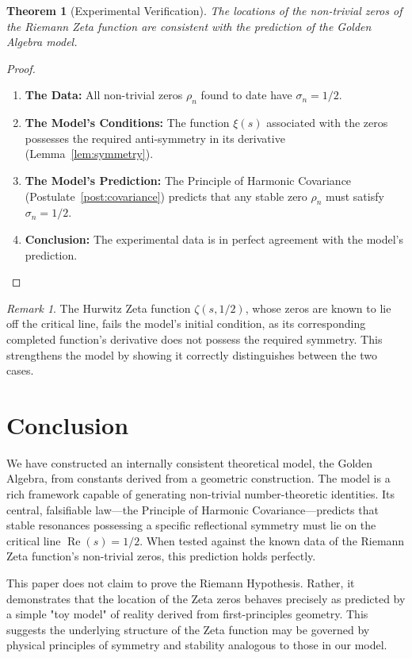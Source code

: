 \documentclass{amsart}
\theoremstyle{plain}
\newtheorem{theorem}{Theorem}
\theoremstyle{definition}
\theoremstyle{remark}
\newtheorem*{remark}{Remark}
\DeclareMathOperator{\re}{Re}
\begin{document}
\begin{theorem}[Experimental Verification]\label{thm:verification}
The locations of the non-trivial zeros of the Riemann Zeta function are consistent with the prediction of the Golden Algebra model.
\end{theorem}
\begin{proof}
\begin{enumerate}
    \item \textbf{The Data:} All non-trivial zeros $\rho_n$ found to date have $\sigma_n=1/2$.
    \item \textbf{The Model's Conditions:} The function $\xi(s)$ associated with the zeros possesses the required anti-symmetry in its derivative (Lemma~\ref{lem:symmetry}).
    \item \textbf{The Model's Prediction:} The Principle of Harmonic Covariance (Postulate~\ref{post:covariance}) predicts that any stable zero $\rho_n$ must satisfy $\sigma_n=1/2$.
    \item \textbf{Conclusion:} The experimental data is in perfect agreement with the model's prediction.
\end{enumerate}
\end{proof}

\begin{remark}
The Hurwitz Zeta function $\zeta(s, 1/2)$, whose zeros are known to lie off the critical line, fails the model's initial condition, as its corresponding completed function's derivative does not possess the required symmetry. This strengthens the model by showing it correctly distinguishes between the two cases.
\end{remark}

\section{Conclusion}
We have constructed an internally consistent theoretical model, the Golden Algebra, from constants derived from a geometric construction. The model is a rich framework capable of generating non-trivial number-theoretic identities. Its central, falsifiable law—the Principle of Harmonic Covariance—predicts that stable resonances possessing a specific reflectional symmetry must lie on the critical line $\re(s)=1/2$. When tested against the known data of the Riemann Zeta function's non-trivial zeros, this prediction holds perfectly.

This paper does not claim to prove the Riemann Hypothesis. Rather, it demonstrates that the location of the Zeta zeros behaves precisely as predicted by a simple "toy model" of reality derived from first-principles geometry. This suggests the underlying structure of the Zeta function may be governed by physical principles of symmetry and stability analogous to those in our model.
\end{document}
